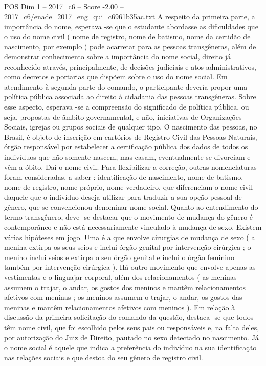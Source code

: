 \begin{textsample}{POS Dim 1 – 2017\_c6 – Score -2.00 – 2017\_c6/enade\_2017\_eng\_qui\_c6961b35ac.txt}
A respeito da primeira parte, a importância do nome, esperava -se que o estudante abordasse as dificuldades que o uso do nome civil ( nome de registro, nome de batismo, nome da certidão de nascimento, por exemplo ) pode acarretar para as pessoas transgêneras, além de demonstrar conhecimento sobre a importância do nome social, direito já reconhecido através, principalmente, de decisões judiciais e atos administrativos, como decretos e portarias que dispõem sobre o uso do nome social.
Em atendimento à segunda parte do comando, o participante deveria propor uma política pública associada ao direito à cidadania das pessoas transgêneras.
Sobre esse aspecto, esperava -se a compreensão do significado de política pública, ou seja, propostas de âmbito governamental, e não, iniciativas de Organizações Sociais, igrejas ou grupos sociais de qualquer tipo.
O nascimento das pessoas, no Brasil, é objeto de inscrição em cartórios de Registro Civil das Pessoas Naturais, órgão responsável por estabelecer a certificação pública dos dados de todos os indivíduos que não somente nascem, mas casam, eventualmente se divorciam e vêm a óbito.
Daí o nome civil.
Para flexibilizar a correção, outras nomenclaturas foram consideradas, a saber : identificação de nascimento, nome de batismo, nome de registro, nome próprio, nome verdadeiro, que diferenciam o nome civil daquele que o indivíduo deseja utilizar para traduzir a sua opção pessoal de gênero, que se convencionou denominar nome social.
Quanto ao entendimento do termo transgênero, deve -se destacar que o movimento de mudança do gênero é contemporâneo e não está necessariamente vinculado à mudança de sexo.
Existem várias hipóteses em jogo.
Uma é a que envolve cirurgias de mudança de sexo ( a menina extirpa os seus seios e inclui órgão genital por intervenção cirúrgica ; o menino inclui seios e extirpa o seu órgão genital e inclui o órgão feminino também por intervenção cirúrgica ).
Há outro movimento que envolve apenas as vestimentas e o linguajar corporal, além dos relacionamentos ( as meninas assumem o trajar, o andar, os gostos dos meninos e mantêm relacionamentos afetivos com meninas ; os meninos assumem o trajar, o andar, os gostos das meninas e mantêm relacionamentos afetivos com meninos ).
Em relação à discussão da primeira solicitação do comando da questão, destaca -se que todos têm nome civil, que foi escolhido pelos seus pais ou responsáveis e, na falta deles, por autorização do Juiz de Direito, pautado no sexo detectado no nascimento.
Já o nome social é aquele que indica a preferência do indivíduo na sua identificação nas relações sociais e que destoa do seu gênero de registro civil.

\end{textsample}
